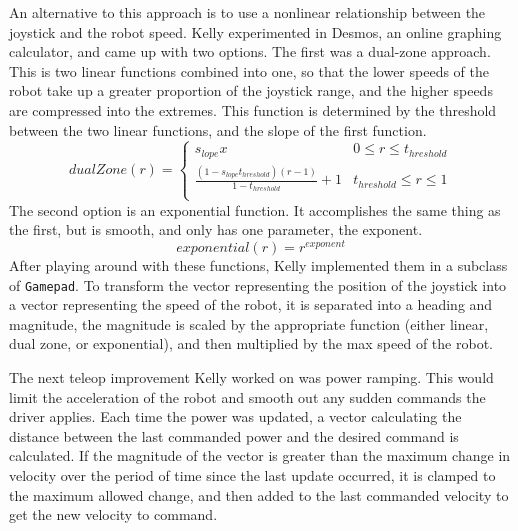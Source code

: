 \documentclass{article}
\begin{document}
An alternative to this approach is to use a nonlinear relationship between the joystick and the robot speed. Kelly experimented in Desmos, an online graphing calculator, and came up with two options. The first was a dual-zone approach. This is two linear functions combined into one, so that the lower speeds of the robot take up a greater proportion of the joystick range, and the higher speeds are compressed into the extremes. This function is determined by the threshold between the two linear functions, and the slope of the first function.
\begin{equation}
dualZone(r) = 
\begin{cases} 
      s_{lope}x & 0 \leq r \leq t_{hreshold}\\
      \frac{(1-s_{lope}t_{hreshold})(r-1)}{1-t_{hreshold}} +1& t_{hreshold} \leq r \leq 1 \\
  \end{cases}
\end{equation}
The second option is an exponential function. It accomplishes the same thing as the first, but is smooth, and only has one parameter, the exponent. 
\begin{equation}
    exponential(r) = r^{exponent}
\end{equation}
After playing around with these functions, Kelly implemented them in a subclass of \texttt{Gamepad}. To transform the vector representing the position of the joystick into a vector representing the speed of the robot, it is separated into a heading and magnitude, the magnitude is scaled by the appropriate function (either linear, dual zone, or exponential), and then multiplied by the max speed of the robot. 

The next teleop improvement Kelly worked on was power ramping. This would limit the acceleration of the robot and smooth out any sudden commands the driver applies. Each time the power was updated, a vector calculating the distance between the last commanded power and the desired command is calculated. If the magnitude of the vector is greater than the maximum change in velocity over the period of time since the last update occurred, it is clamped to the maximum allowed change, and then added to the last commanded velocity to get the new velocity to command. 
\end{document}
